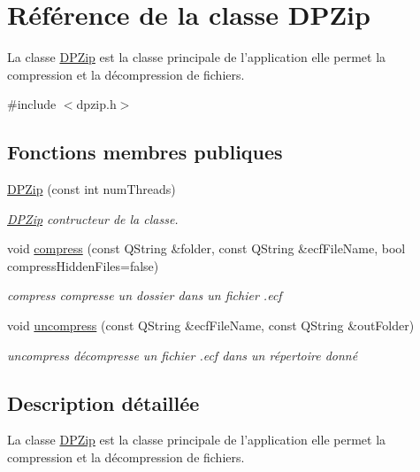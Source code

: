 \hypertarget{class_d_p_zip}{\section{Référence de la classe D\+P\+Zip}
\label{class_d_p_zip}
}


La classe \hyperlink{class_d_p_zip}{D\+P\+Zip} est la classe principale de l'application elle permet la compression et la décompression de fichiers.  




{\ttfamily \#include $<$dpzip.\+h$>$}

\subsection*{Fonctions membres publiques}
\begin{DoxyCompactItemize}
\item 
\hyperlink{class_d_p_zip_ac6061f1fb5304fa46d2cb036faf513cb}{D\+P\+Zip} (const int num\+Threads)
\begin{DoxyCompactList}\small\item\em \hyperlink{class_d_p_zip}{D\+P\+Zip} contructeur de la classe. \end{DoxyCompactList}\item 
void \hyperlink{class_d_p_zip_a5210127d2033c46124082aaff4d0b389}{compress} (const Q\+String \&folder, const Q\+String \&ecf\+File\+Name, bool compress\+Hidden\+Files=false)
\begin{DoxyCompactList}\small\item\em compress compresse un dossier dans un fichier .ecf \end{DoxyCompactList}\item 
void \hyperlink{class_d_p_zip_a6e0195fe368f40cb232596cf135675e7}{uncompress} (const Q\+String \&ecf\+File\+Name, const Q\+String \&out\+Folder)
\begin{DoxyCompactList}\small\item\em uncompress décompresse un fichier .ecf dans un répertoire donné \end{DoxyCompactList}\end{DoxyCompactItemize}


\subsection{Description détaillée}
La classe \hyperlink{class_d_p_zip}{D\+P\+Zip} est la classe principale de l'application elle permet la compression et la décompression de fichiers. 

